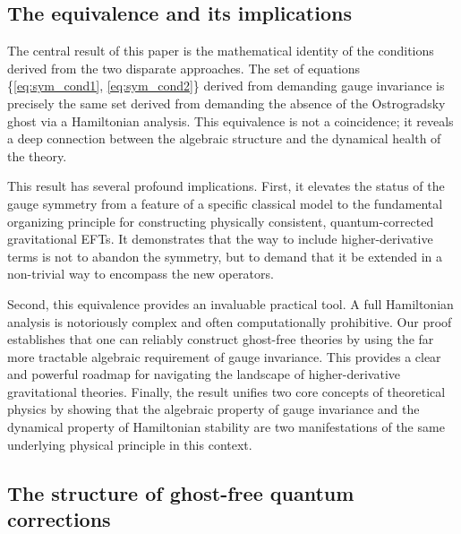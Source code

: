 \documentclass[twocolumn]{aastex631}
\begin{document}
\subsection{The equivalence and its implications}

The central result of this paper is the mathematical identity of the conditions derived from the two disparate approaches. The set of equations \{\eqref{eq:sym_cond1}, \eqref{eq:sym_cond2}\} derived from demanding gauge invariance is precisely the same set derived from demanding the absence of the Ostrogradsky ghost via a Hamiltonian analysis. This equivalence is not a coincidence; it reveals a deep connection between the algebraic structure and the dynamical health of the theory.

This result has several profound implications. First, it elevates the status of the gauge symmetry from a feature of a specific classical model to the fundamental organizing principle for constructing physically consistent, quantum-corrected gravitational EFTs. It demonstrates that the way to include higher-derivative terms is not to abandon the symmetry, but to demand that it be extended in a non-trivial way to encompass the new operators.

Second, this equivalence provides an invaluable practical tool. A full Hamiltonian analysis is notoriously complex and often computationally prohibitive. Our proof establishes that one can reliably construct ghost-free theories by using the far more tractable algebraic requirement of gauge invariance. This provides a clear and powerful roadmap for navigating the landscape of higher-derivative gravitational theories. Finally, the result unifies two core concepts of theoretical physics by showing that the algebraic property of gauge invariance and the dynamical property of Hamiltonian stability are two manifestations of the same underlying physical principle in this context.

\subsection{The structure of ghost-free quantum corrections}
\end{document}
